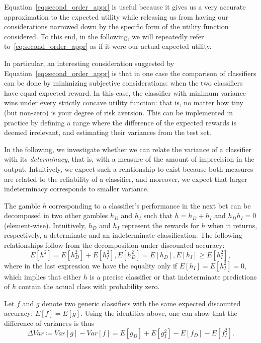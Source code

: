\documentclass[a4paper,10pt,reqno]{amsart}
\theoremstyle{remark}
\begin{document}
Equation~\eqref{eq:second_order_appr} is useful because it gives us a very accurate approximation to the expected utility while releasing us from having our considerations narrowed down by the specific form of the utility function considered. To this end, in the following, we will repeatedly refer to~\eqref{eq:second_order_appr} as if it were our actual expected utility.

In particular, an interesting consideration suggested by Equation~\eqref{eq:second_order_appr} is that in one case the comparison of classifiers can be done by minimizing subjective considerations: when the two classifiers have equal expected reward. In this case, the classifier with minimum variance wins under every strictly concave utility function: that is, no matter how tiny (but non-zero) is your degree of risk aversion. This can be implemented in practice by defining a range where the difference of the expected rewards is deemed irrelevant, and estimating their variances from the test set.

In the following, we investigate whether we can relate the variance of a classifier with its \emph{determinacy}, that is, with a measure of the amount of imprecision in the output. Intuitively, we expect such a relationship to exist because both measures are related to the reliability of a classifier, and moreover, we expect that larger indeterminacy corresponds to smaller variance.

The gamble $h$ corresponding to a classifier's performance in the next bet can be decomposed in two other gambles $h_D$ and $h_I$ such that $h=h_D+h_I$ and $h_Dh_I=0$ (element-wise). Intuitively, $h_D$ and $h_I$ represent the rewards for
$h$ when it returns, respectively, a determinate and an
indeterminate classification. The following relationships
follow from the decomposition under discounted accuracy:
 \begin{equation*}
   E[h^2] = E[h_D^2]+E[h_I^2], E[h_D^2] = E[h_D], E[h_I] \geq E[h_I^2],%
 \end{equation*}
where in the last expression we have the equality only if
 $E[h_I]=E[h_I^2]=0$, which implies that either $h$ is a precise
 classifier or that indeterminate predictions of $h$ contain the
actual class with probability zero.

 Let $f$ and $g$ denote two generic classifiers with the same expected discounted accuracy: $E[f]=E[g]$. Using the identities above, one
 can show that the difference of variances is
 thus
\begin{equation} %
  \Delta Var \coloneqq  Var[g] - Var[f]
  = E[g_D] + E[g_I^2] - E[f_D] - E[f_I^2].  \label{eq:deltavar}
\end{equation}
\end{document}

